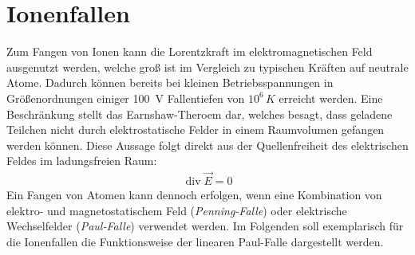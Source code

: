 \documentclass[twocolumn]{revtex4}
\DeclareMathOperator{\divergence}{div}
\begin{document}
\section{Ionenfallen}
Zum Fangen von Ionen kann die Lorentzkraft im elektromagnetischen Feld ausgenutzt werden, welche groß ist im Vergleich zu typischen Kräften auf neutrale Atome.
Dadurch können bereits bei kleinen Betriebsspannungen in Größenordnungen einiger \SI{100}{V} Fallentiefen von $10^6 \, \si{K}$ erreicht werden.
Eine Beschränkung stellt das Earnshaw-Theroem dar, welches besagt, dass geladene Teilchen nicht durch elektrostatische Felder in einem Raumvolumen gefangen werden können.
Diese Aussage folgt direkt aus der Quellenfreiheit des elektrischen Feldes im ladungsfreien Raum:
\begin{align}
	\divergence \vec{E} = 0
\end{align}
Ein Fangen von Atomen kann dennoch erfolgen, wenn eine Kombination von elektro- und magnetostatischem Feld (\emph{Penning-Falle}) oder elektrische Wechselfelder (\emph{Paul-Falle}) verwendet werden.
Im Folgenden soll exemplarisch für die Ionenfallen die Funktionsweise der linearen Paul-Falle dargestellt werden.
\end{document}
